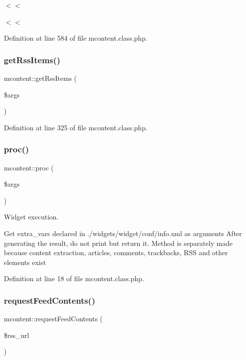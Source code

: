 $<$$<$

$<$$<$ 

Definition at line 584 of file mcontent.\+class.\+php.

\mbox{\label{classmcontent_a4b6b633f77c7f2280e1a0fde292b8a62}} 
\subsubsection{\texorpdfstring{get\+Rss\+Items()}{getRssItems()}}
{\footnotesize\ttfamily mcontent\+::get\+Rss\+Items (\begin{DoxyParamCaption}\item[{}]{\$args }\end{DoxyParamCaption})}



Definition at line 325 of file mcontent.\+class.\+php.

\mbox{\label{classmcontent_abdf3692374f645c0a808db2225b9fec3}} 
\subsubsection{\texorpdfstring{proc()}{proc()}}
{\footnotesize\ttfamily mcontent\+::proc (\begin{DoxyParamCaption}\item[{}]{\$args }\end{DoxyParamCaption})}



Widget execution. 

Get extra\+\_\+vars declared in ./widgets/widget/conf/info.xml as arguments After generating the result, do not print but return it. Method is separately made because content extraction, articles, comments, trackbacks, R\+SS and other elements exist

Definition at line 18 of file mcontent.\+class.\+php.

\mbox{\label{classmcontent_a9c74009a166bfac6a467cb27bc2ad214}} 
\subsubsection{\texorpdfstring{request\+Feed\+Contents()}{requestFeedContents()}}
{\footnotesize\ttfamily mcontent\+::request\+Feed\+Contents (\begin{DoxyParamCaption}\item[{}]{\$rss\+\_\+url }\end{DoxyParamCaption})}



